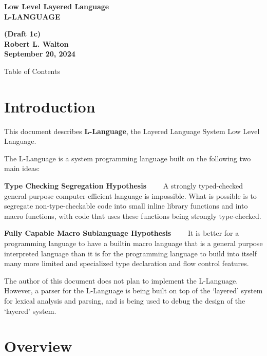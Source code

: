 \documentclass[12pt]{article}
\makeatletter
\renewcommand\tableofcontents{%
    \begin{list}{}%
	     {\setlength{\itemsep}{0in}%
	      \setlength{\topsep}{0in}%
	      \setlength{\parsep}{1ex}%
	      \setlength{\labelwidth}{0in}%
	      \setlength{\baselineskip}{1.5ex}%
	      \setlength{\leftmargin}{0.4in}%
	      \setlength{\rightmargin}{0.4in}}%
    \item\@starttoc{toc}%
    \end{list}}
\newcommand{\key}[1]{{\rm \bfseries #1}}
\newenvironment{indpar}[1][0.3in]%
	{\begin{list}{}%
		     {\setlength{\itemsep}{0in}%
		      \setlength{\topsep}{0in}%
		      \setlength{\parsep}{1ex}%
		      \setlength{\labelwidth}{#1}%
		      \setlength{\leftmargin}{#1}%
		      \addtolength{\leftmargin}{\labelsep}}%
	 \item}%
	{\end{list}}
\makeatother
\begin{document}
\begin{center}
\Large \bf
Low Level Layered Language\\[0.5ex]
\huge \bf
L-LANGUAGE
\end{center}
\begin{center}
\large \bf
(Draft 1c)
\\[0.5ex]
Robert L. Walton\\
September 20, 2024

\bigskip

Table of Contents
\end{center}

\bigskip

\tableofcontents

\newpage

\section{Introduction}

This document describes \key{L-Language}, the Layered Language
System Low Level Language.

The L-Language is a system programming language built on the
following two main ideas:

\begin{indpar}

\key{Type Checking Segregation Hypothesis}~~~~ A strongly typed-checked
general-purpose computer-efficient language is impossible.
What is possible is
to segregate non-type-checkable code into small inline
library functions and into macro functions,
with code that uses these functions being
strongly type-checked.

\key{Fully Capable Macro Sublanguage Hypothesis}~~~~ It is better for
a programming language to have a builtin macro language that
is a general purpose interpreted language than it is for the
programming language to build into itself
many more limited and specialized type declaration and
flow control features.

\end{indpar}

The author of this document does not plan to implement the L-Language.
However, a parser for the L-Language is being built on top of the
`layered' system for lexical analysis and parsing, and is being used
to debug the design of the `layered' system.

\section{Overview}
\end{document}
